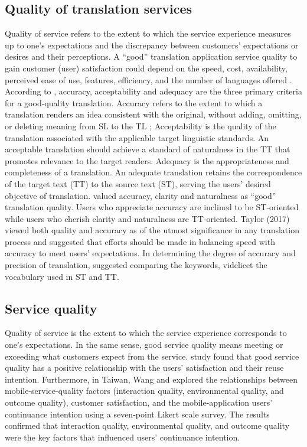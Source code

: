 \documentclass[english]{textolivre}
\begin{document}
\subsection{Quality of translation services}\label{sec-formato}
Quality of service refers to the extent to which the service experience measures up to one’s expectations and the discrepancy between customers’ expectations or desires and their perceptions. A “good” translation application service quality to gain customer (user) satisfaction could depend on the speed, cost, availability, perceived ease of use, features, efficiency, and the number of languages offered \cite{arahita_factors_2015}. According to \textcite{savitri_analysis_2018}, accuracy, acceptability and adequacy are the three primary criteria for a good-quality translation. Accuracy refers to the extent to which a translation renders an idea consistent with the original, without adding, omitting, or deleting meaning from SL to the TL \cite{sharma_relevance_2015}; Acceptability is the quality of the translation associated with the applicable target linguistic standards. An acceptable translation should achieve a standard of naturalness in the TT that promotes relevance to the target readers. Adequacy is the appropriateness and completeness of a translation. An adequate translation retains the correspondence of the target text (TT) to the source text (ST), serving the users’ desired objective of translation. \textcite{nababan_teori_2008} valued accuracy, clarity and naturalness as “good” translation quality. Users who appreciate accuracy are inclined to be ST-oriented while users who cherish clarity and naturalness are TT-oriented. \textcite{taylor_balancing_2017}Taylor (2017) viewed both quality and accuracy as of the utmost significance in any translation process and suggested that efforts should be made in balancing speed with accuracy to meet users’ expectations. In determining the degree of accuracy and precision of translation, \textcite{farahani_framework_2005} suggested comparing the keywords, videlicet the vocabulary used in ST and TT.

\subsection{Service quality}\label{sec-modelo}
Quality of service is the extent to which the service experience corresponds to one’s expectations. In the same sense, good service quality means meeting or exceeding what customers expect from the service. \textcite{jeon_influence_2016} study found that good service quality has a positive relationship with the users’ satisfaction and their reuse intention. Furthermore, in Taiwan, Wang and \textcite{chen_machine_2017} explored the relationships between mobile-service-quality factors (interaction quality, environmental quality, and outcome quality), customer satisfaction, and the mobile-application users’ continuance intention using a seven-point Likert scale survey. The results confirmed that interaction quality, environmental quality, and outcome quality were the key factors that influenced users’ continuance intention.
\end{document}
